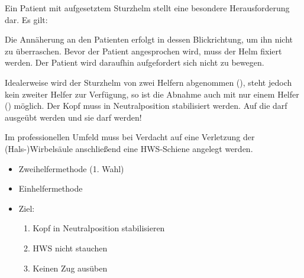 {Ein Patient mit aufgesetztem Sturzhelm stellt eine
besondere Herausforderung dar. Es gilt:

Die Annäherung an den Patienten erfolgt in dessen
Blickrichtung, um ihn nicht zu überraschen. Bevor der
Patient angesprochen wird, muss der Helm fixiert
werden. Der Patient wird daraufhin aufgefordert sich nicht
zu bewegen. 

Idealerweise wird der Sturzhelm von zwei Helfern abgenommen
(), 
steht jedoch kein zweiter Helfer zur Verfügung, so
ist die Abnahme 
auch mit nur einem Helfer 
() 
möglich. Der Kopf
muss in Neutralposition stabilisiert werden. Auf
die  darf  ausgeübt
werden und sie darf 
werden!~\cite{ITLSde6,AsboeLehrmeinungRd2011-07}

Im professionellen Umfeld muss bei Verdacht auf eine
Verletzung der (Hals-)Wirbelsäule
anschließend eine HWS-Schiene angelegt 
werden. 
}{
\begin{itemize}
  \item Zweihelfermethode (1. Wahl)
  \item Einhelfermethode
  \item Ziel:
  \begin{enumerate}
    \item Kopf in Neutralposition
    stabilisieren
    \item HWS nicht stauchen
    \item Keinen Zug ausüben
  \end{enumerate}
\end{itemize}
}
{}
{}
{}


